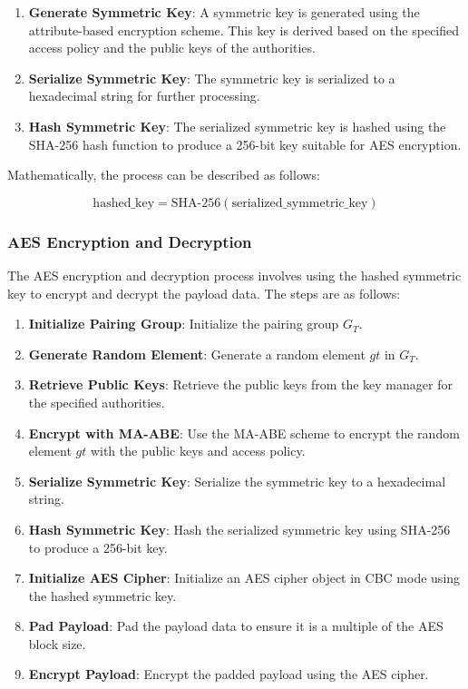 \documentclass[cic,tc,english]{iiufrgs}
\begin{document}
                \begin{enumerate}
                    \item \textbf{Generate Symmetric Key}: A symmetric key is generated using the attribute-based encryption scheme. This key is derived based on the specified access policy and the public keys of the authorities.
                    \item \textbf{Serialize Symmetric Key}: The symmetric key is serialized to a hexadecimal string for further processing.
                    \item \textbf{Hash Symmetric Key}: The serialized symmetric key is hashed using the SHA-256 hash function to produce a 256-bit key suitable for AES encryption.
                \end{enumerate}

                Mathematically, the process can be described as follows:

                \begin{equation}
                \text{hashed\_key} = \text{SHA-256}(\text{serialized\_symmetric\_key})
                \end{equation}
            \subsubsection{AES Encryption and Decryption}

                The AES encryption and decryption process involves using the hashed symmetric key to encrypt and decrypt the payload data. The steps are as follows:

                \begin{enumerate}
                    \item \textbf{Initialize Pairing Group}: Initialize the pairing group \(G_T\).
                    \item \textbf{Generate Random Element}: Generate a random element \(gt\) in \(G_T\).
                    \item \textbf{Retrieve Public Keys}: Retrieve the public keys from the key manager for the specified authorities.
                    \item \textbf{Encrypt with MA-ABE}: Use the MA-ABE scheme to encrypt the random element \(gt\) with the public keys and access policy.
                    \item \textbf{Serialize Symmetric Key}: Serialize the symmetric key to a hexadecimal string.
                    \item \textbf{Hash Symmetric Key}: Hash the serialized symmetric key using SHA-256 to produce a 256-bit key.
                    \item \textbf{Initialize AES Cipher}: Initialize an AES cipher object in CBC mode using the hashed symmetric key.
                    \item \textbf{Pad Payload}: Pad the payload data to ensure it is a multiple of the AES block size.
                    \item \textbf{Encrypt Payload}: Encrypt the padded payload using the AES cipher.
                \end{enumerate}
\end{document}
